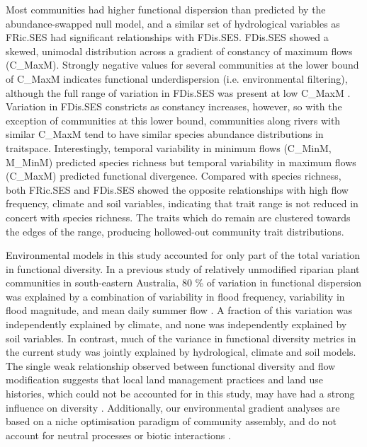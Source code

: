 \documentclass[openright,12pt,a4paper]{memoir}
\begin{document}
Most communities had higher functional dispersion than predicted by the abundance-swapped null model, and a similar set of hydrological variables as FRic.SES had significant relationships with FDis.SES. FDis.SES showed a skewed, unimodal distribution across a gradient of constancy of maximum flows (C\_MaxM). Strongly negative values for several communities at the lower bound of C\_MaxM indicates functional underdispersion (i.e. environmental filtering), although the full range of variation in FDis.SES was present at low C\_MaxM \citep{Mason2013}. Variation in FDis.SES constricts as constancy increases, however, so with the exception of communities at this lower bound, communities along rivers with similar C\_MaxM tend to have similar species abundance distributions in traitspace. Interestingly, temporal variability in minimum flows (C\_MinM, M\_MinM) predicted species richness but temporal variability in maximum flows (C\_MaxM) predicted functional divergence. Compared with species richness, both FRic.SES and FDis.SES showed the opposite relationships with high flow frequency, climate and soil variables, indicating that trait range is not reduced in concert with species richness. The traits which do remain are clustered towards the edges of the range, producing hollowed-out community trait distributions. 

Environmental models in this study accounted for only part of the total variation in functional diversity. In a previous study of relatively unmodified riparian plant communities in south-eastern Australia, 80 \% of variation in functional dispersion was explained by a combination of variability in flood frequency, variability in flood magnitude, and mean daily summer flow \citep{Lawson2015a}. A fraction of this variation was independently explained by climate, and none was independently explained by soil variables. In contrast, much of the variance in functional diversity metrics in the current study was jointly explained by hydrological, climate and soil models. The single weak relationship observed between functional diversity and flow modification suggests that local land management practices and land use histories, which could not be accounted for in this study, may have had a strong influence on diversity \citep{Foster2003}. Additionally, our environmental gradient analyses are based on a niche optimisation paradigm of community assembly, and do not account for neutral processes or biotic interactions \citep{Kraft2015}.
\end{document}
